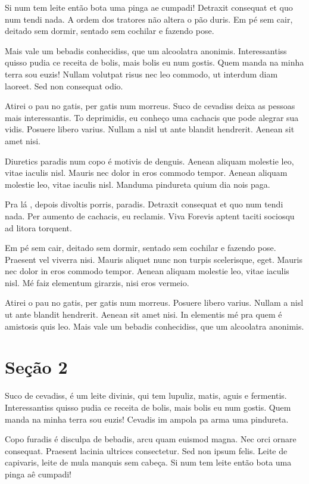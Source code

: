 \documentclass{article}
\begin{document}
	Si num tem leite então bota uma pinga ae cumpadi! Detraxit consequat et quo num tendi nada. A ordem dos tratores não altera o pão duris. Em pé sem cair, deitado sem dormir, sentado sem cochilar e fazendo pose.
	
	Mais vale um bebadis conhecidiss, que um alcoolatra anonimis. Interessantiss quisso pudia ce receita de bolis, mais bolis eu num gostis. Quem manda na minha terra sou euzis! Nullam volutpat risus nec leo commodo, ut interdum diam laoreet. Sed non consequat odio.
	
	Atirei o pau no gatis, per gatis num morreus. Suco de cevadiss deixa as pessoas mais interessantis. To deprimidis, eu conheço uma cachacis que pode alegrar sua vidis. Posuere libero varius. Nullam a nisl ut ante blandit hendrerit. Aenean sit amet nisi.
	
	Diuretics paradis num copo é motivis de denguis. Aenean aliquam molestie leo, vitae iaculis nisl. Mauris nec dolor in eros commodo tempor. Aenean aliquam molestie leo, vitae iaculis nisl. Manduma pindureta quium dia nois paga.
	
	Pra lá , depois divoltis porris, paradis. Detraxit consequat et quo num tendi nada. Per aumento de cachacis, eu reclamis. Viva Forevis aptent taciti sociosqu ad litora torquent.
	
	Em pé sem cair, deitado sem dormir, sentado sem cochilar e fazendo pose. Praesent vel viverra nisi. Mauris aliquet nunc non turpis scelerisque, eget. Mauris nec dolor in eros commodo tempor. Aenean aliquam molestie leo, vitae iaculis nisl. Mé faiz elementum girarzis, nisi eros vermeio.
	
	Atirei o pau no gatis, per gatis num morreus. Posuere libero varius. Nullam a nisl ut ante blandit hendrerit. Aenean sit amet nisi. In elementis mé pra quem é amistosis quis leo. Mais vale um bebadis conhecidiss, que um alcoolatra anonimis.
	
	\section{Seção 2}
	
	Suco de cevadiss, é um leite divinis, qui tem lupuliz, matis, aguis e fermentis. Interessantiss quisso pudia ce receita de bolis, mais bolis eu num gostis. Quem manda na minha terra sou euzis! Cevadis im ampola pa arma uma pindureta.
	
	Copo furadis é disculpa de bebadis, arcu quam euismod magna. Nec orci ornare consequat. Praesent lacinia ultrices consectetur. Sed non ipsum felis. Leite de capivaris, leite de mula manquis sem cabeça. Si num tem leite então bota uma pinga aê cumpadi!
	
\end{document}
